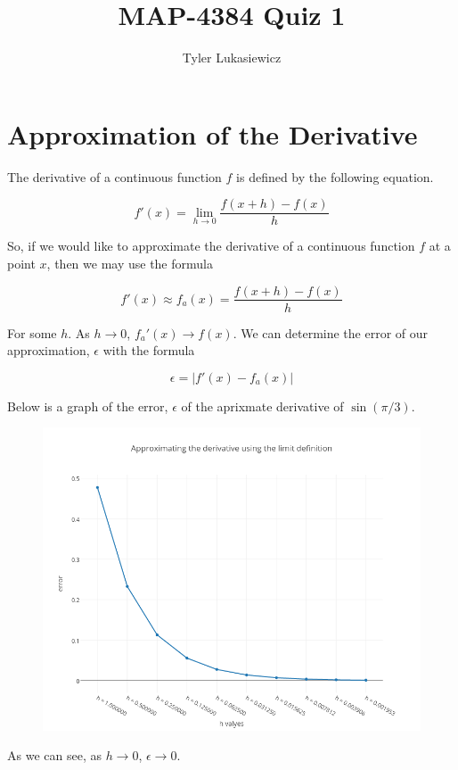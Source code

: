 \documentclass[conference]{IEEEtran}
\title{MAP-4384 Quiz 1}
\author{Tyler Lukasiewicz }
\begin{document}
\maketitle

    \section{Approximation of the Derivative}
    \label{sec:Approximation of the Derivative}

        The derivative of a continuous function $f$ is defined by the following equation. 

        \begin{equation}
            f'(x) = \lim _ {h \to 0 } \frac{f(x+h) - f(x)}{h} 
        \end{equation}

        So, if we would like to approximate the derivative of a continuous function $f$ at a point $x$, then we may use the formula

        \begin{equation}
            f'(x) \approx  f_a(x) = \frac{f(x+h) - f(x)}{h} 
        \end{equation}

        For some $h$. As $h \to 0$, $f_a'(x) \to f(x)$. We can determine the error of our approximation,  $\epsilon$ with the formula 

        \begin{equation}
            \epsilon = |f'(x) - f_a(x)|
        \end{equation}

        Below is a graph of the error, $\epsilon$ of the  aprixmate derivative of $\sin (\pi / 3)$.

        \begin{figure}[!ht]
           \begin{center}
               \includegraphics[scale=.50]{graph}
           \end{center}
            \label{fig:1}
        \end{figure}

        As we can see, as $h \to 0$, $\epsilon \to 0$.
\end{document}
